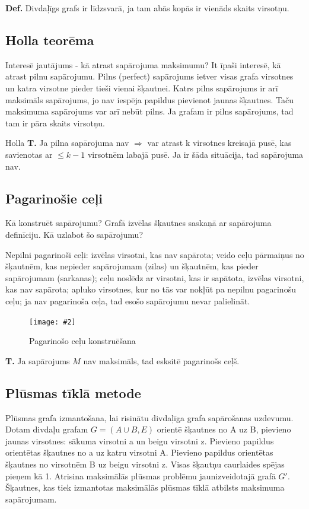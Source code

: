 \documentclass{article}
\newcommand{\illustration}[3]{
	\begin{figure}[H]
		\centering	
		\texttt{[image: \#2]}
		\caption{#3}
	\end{figure}
}
\begin{document}
\textbf{Def.} Divdaļīgs grafs ir līdzsvarā, ja tam abās kopās ir vienāds skaits virsotņu.

\subsection{Holla teorēma}

Interesē jautājums - kā atrast sapārojuma maksimumu?  It īpaši interesē, kā atrast pilnu sapārojumu.  Pilns (perfect) sapārojums ietver visas grafa virsotnes un katra virsotne pieder tieši vienai šķautnei.  Katrs pilns sapārojums ir arī maksimāls sapārojums, jo nav iespēja papildus pievienot jaunas šķautnes. Taču maksimuma sapārojums var arī nebūt pilns.  Ja grafam ir pilns sapārojums, tad tam ir pāra skaits virsotņu.


Holla \textbf{T. }Ja pilna sapārojuma nav $⇒$ var atrast k virsotnes kreisajā pusē, kas savienotas ar $\le k − 1$ virsotnēm labajā pusē.  Ja ir šāda situācija, tad sapārojuma nav.

\subsection{Pagarinošie ceļi}

Kā konstruēt sapārojumu?  Grafā izvēlas šķautnes saskaņā ar sapārojuma definīciju.  Kā uzlabot šo sapārojumu?


Nepilni pagarinoši ceļi: izvēlas virsotni, kas nav sapārota; veido ceļu pārmaiņus no šķautnēm, kas nepieder sapārojumam (zilas) un šķautnēm, kas pieder sapārojumam (sarkanas); ceļu noslēdz ar virsotni, kas ir sapātota, izvēlas virsotni, kas nav sapārota; apluko virsotnes, kur no tās var nokļūt pa nepilnu pagarinošu ceļu; ja nav pagarinoša ceļa, tad esošo sapārojumu nevar palielināt.

\illustration{1}{nepilni_pagar_celi-1}{Pagarinošo ceļu konstruēšana}

\textbf{T. } Ja sapārojums $M$ nav maksimāls, tad esksitē pagarinošs ceļš.

\subsection{Plūsmas tīklā metode}

Plūsmas grafa izmantošana, lai risinātu divdaļīga grafa sapārošanas uzdevumu. Dotam divdaļu grafam $G = (A \cup B, E )$ orientē šķautnes no A uz B, pievieno jaunas virsotnes: sākuma virsotni a un beigu virsotni z. Pievieno papildus orientētas šķautnes no a uz katru virsotni A. Pievieno papildus orientētas šķautnes no virsotnēm B uz beigu virsotni z. Visas šķautņu caurlaides spējas pieņem kā 1. Atrisina maksimālās plūsmas problēmu jaunizveidotajā grafā $G'$.  Šķautnes, kas tiek izmantotas maksimālās plūsmas tīklā atbilsts maksimuma sapārojumam.


\printindex
\end{document}
